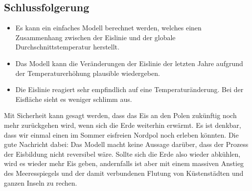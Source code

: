 \begin{refsection}
\section{Schlussfolgerung}
\begin{itemize}
	\item Es kann ein einfaches Modell berechnet werden, welches einen Zusammenhang zwischen der Eislinie und der globale Durchschnittstemperatur herstellt.
	\item Das Modell kann die Veränderungen der Eislinie der letzten Jahre aufgrund der Temperaturerhöhung plausible wiedergeben.
	\item Die Eislinie reagiert sehr empfindlich auf eine Temperaturänderung. Bei der Eisfläche sieht es weniger schlimm aus. 
\end{itemize}
Mit Sicherheit kann gesagt werden, dass das Eis an den Polen zukünftig noch mehr zurückgehen wird, wenn sich die Erde weiterhin erwärmt. Es ist denkbar, dass wir einmal einen im Sommer eisfreien Nordpol noch erleben könnten. Die gute Nachricht dabei: Das Modell macht keine Aussage darüber, dass der Prozess der Eisbildung nicht reversibel wäre. Sollte sich die Erde also wieder abkühlen, wird es wieder mehr Eis geben, andernfalls ist aber mit einem massiven Anstieg des Meeresspiegels und der damit verbundenen Flutung von Küstenstädten und ganzen Inseln zu rechen.
\printbibliography[heading=subbibliography]
\end{refsection}
